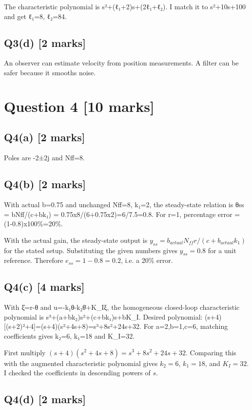 \documentclass[11pt,a4paper]{article}
\begin{document}
The characteristic polynomial is s²+(ℓ₁+2)s+(2ℓ₁+ℓ₂).
I match it to s²+10s+100 and get ℓ₁=8, ℓ₂=84.

\subsection*{Q3(d) \hfill [2 marks]}

An observer can estimate velocity from position measurements.
A filter can be safer because it smooths noise.

\section*{Question 4 \hfill [10 marks]}
\subsection*{Q4(a) \hfill [2 marks]}

Poles are -2±2j and Nff=8.

\subsection*{Q4(b) \hfill [2 marks]}

With actual b=0.75 and unchanged Nff=8, k₁=2, the steady-state relation is θss = bNff/(c+bk₁) = 0.75x8/(6+0.75x2)=6/7.5=0.8.
For r=1, percentage error = (1-0.8)x100\%=20\%.\par\smallskip With the actual gain, the steady-state output is $y_{ss}=b_{actual}N_{ff}r/ (c+b_{actual}k_1)$ for the stated setup. Substituting the given numbers gives $y_{ss}=0.8$ for a unit reference. Therefore $e_{ss}=1-0.8=0.2$, i.e. a 20\% error.

\subsection*{Q4(c) \hfill [4 marks]}

With ξ̇=r-θ and u=-k₁θ-k₂θ̇+K\_Iξ, the homogeneous closed-loop characteristic polynomial is s³+(a+bk₂)s²+(c+bk₁)s+bK\_I.
Desired polynomial: (s+4)[(s+2)²+4]=(s+4)(s²+4s+8)=s³+8s²+24s+32.
For a=2,b=1,c=6, matching coefficients gives k₂=6, k₁=18 and K\_I=32.\par\smallskip First multiply $(s+4)(s^2+4s+8)=s^3+8s^2+24s+32$. Comparing this with the augmented characteristic polynomial gives $k_2=6$, $k_1=18$, and $K_I=32$. I checked the coefficients in descending powers of $s$.

\subsection*{Q4(d) \hfill [2 marks]}
\end{document}

